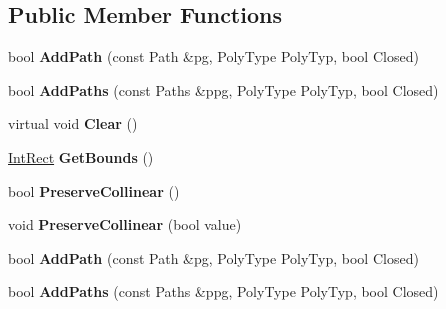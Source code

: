 \subsection*{Public Member Functions}
\begin{DoxyCompactItemize}
\item 
\mbox{\label{classClipperLib_1_1ClipperBase_a7545ac6e146894dc8416887eadd01dba}} 
bool {\bfseries Add\+Path} (const Path \&pg, Poly\+Type Poly\+Typ, bool Closed)
\item 
\mbox{\label{classClipperLib_1_1ClipperBase_a2395967b47fb9f3f5846e2bf56c18f67}} 
bool {\bfseries Add\+Paths} (const Paths \&ppg, Poly\+Type Poly\+Typ, bool Closed)
\item 
\mbox{\label{classClipperLib_1_1ClipperBase_a5690952fe8c2cb047025566405827821}} 
virtual void {\bfseries Clear} ()
\item 
\mbox{\label{classClipperLib_1_1ClipperBase_a5590a5454248ac3f6beeba7f9690f62e}} 
\hyperlink{structClipperLib_1_1IntRect}{Int\+Rect} {\bfseries Get\+Bounds} ()
\item 
\mbox{\label{classClipperLib_1_1ClipperBase_a95c47199aeb139b13059968bc6056f44}} 
bool {\bfseries Preserve\+Collinear} ()
\item 
\mbox{\label{classClipperLib_1_1ClipperBase_aa827cfffd9be40dba7d503a3da708b91}} 
void {\bfseries Preserve\+Collinear} (bool value)
\item 
\mbox{\label{classClipperLib_1_1ClipperBase_a7545ac6e146894dc8416887eadd01dba}} 
bool {\bfseries Add\+Path} (const Path \&pg, Poly\+Type Poly\+Typ, bool Closed)
\item 
\mbox{\label{classClipperLib_1_1ClipperBase_a2395967b47fb9f3f5846e2bf56c18f67}} 
bool {\bfseries Add\+Paths} (const Paths \&ppg, Poly\+Type Poly\+Typ, bool Closed)
\item 
\mbox{\label{classClipperLib_1_1ClipperBase_a45ea7925abc6d0324dc55beea5b0bc22}} 

\end{DoxyCompactItemize}
